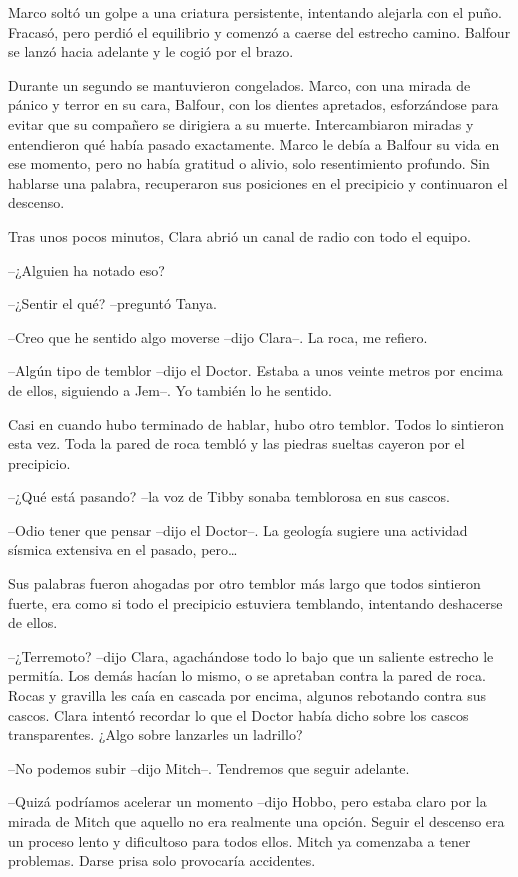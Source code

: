 {Marco soltó un golpe a una criatura persistente, intentando alejarla con
 el puño. Fracasó, pero perdió el equilibrio y comenzó a caerse del
 estrecho camino. Balfour se lanzó hacia adelante y le cogió por el
brazo.}

{Durante un segundo se mantuvieron congelados. Marco, con una mirada de
 pánico y terror en su cara, Balfour, con los dientes apretados,
 esforzándose para evitar que su compañero se dirigiera a su muerte.
 Intercambiaron miradas y entendieron qué había pasado exactamente. Marco
 le debía a Balfour su vida en ese momento, pero no había gratitud o
 alivio, solo resentimiento profundo. Sin hablarse una palabra,
recuperaron sus posiciones en el precipicio y continuaron el descenso.}

{Tras unos pocos minutos, Clara abrió un canal de radio con todo el
equipo.}

{--¿Alguien ha notado eso?}

{--¿Sentir el qué? --preguntó Tanya.}

{--Creo que he sentido algo moverse --dijo Clara--. La roca, me
refiero.}

{--Algún tipo de temblor --dijo el Doctor. Estaba a unos veinte metros
por encima de ellos, siguiendo a Jem--. Yo también lo he sentido.}

{Casi en cuando hubo terminado de hablar, hubo otro temblor. Todos lo
 sintieron esta vez. Toda la pared de roca tembló y las piedras sueltas
cayeron por el precipicio.}

{--¿Qué está pasando? --la voz de Tibby sonaba temblorosa en sus
cascos.}

{--Odio tener que pensar --dijo el Doctor--. La geología sugiere una
 actividad sísmica extensiva en el pasado, pero\ldots{}}

{Sus palabras fueron ahogadas por otro temblor más largo que todos
 sintieron fuerte, era como si todo el precipicio estuviera temblando,
intentando deshacerse de ellos.}

{--¿Terremoto? --dijo Clara, agachándose todo lo bajo que un saliente
 estrecho le permitía. Los demás hacían lo mismo, o se apretaban contra
 la pared de roca. Rocas y gravilla les caía en cascada por encima,
 algunos rebotando contra sus cascos. Clara intentó recordar lo que el
 Doctor había dicho sobre los cascos transparentes. ¿Algo sobre lanzarles
un ladrillo?}

{--No podemos subir --dijo Mitch--. Tendremos que seguir adelante.}

{--Quizá podríamos acelerar un momento --dijo Hobbo, pero estaba claro
 por la mirada de Mitch que aquello no era realmente una opción. Seguir
 el descenso era un proceso lento y dificultoso para todos ellos. Mitch
 ya comenzaba a tener problemas. Darse prisa solo provocaría
accidentes.}

